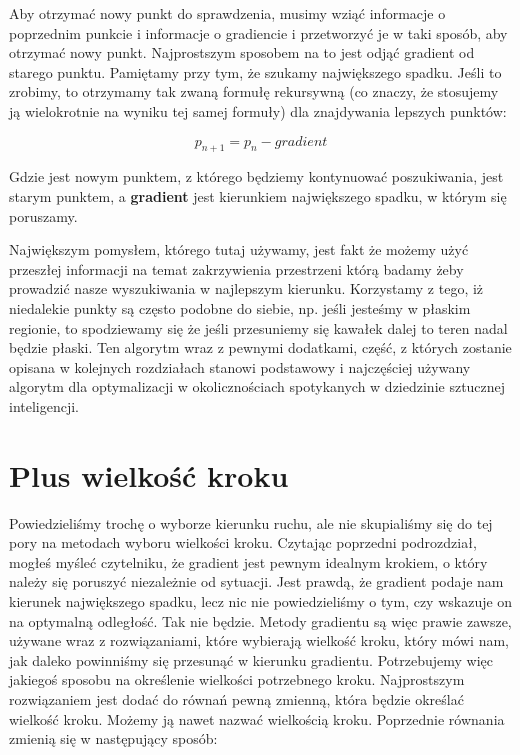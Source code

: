 Aby otrzymać nowy punkt do sprawdzenia, musimy wziąć informacje o poprzednim punkcie i informacje o gradiencie i przetworzyć je w taki sposób, aby otrzymać
nowy punkt. Najprostszym sposobem na to jest odjąć gradient od starego punktu. Pamiętamy przy tym, że szukamy największego spadku. Jeśli to zrobimy, to otrzymamy tak zwaną formułę rekursywną (co znaczy, że stosujemy ją wielokrotnie na wyniku tej samej formuły) dla znajdywania lepszych punktów:

\begin{equation}
p_{n+1} = p_n - gradient
\end{equation}

\noindent Gdzie  jest nowym punktem, z którego będziemy kontynuować poszukiwania,  jest starym punktem, a \textbf{gradient} jest kierunkiem największego spadku, w którym się poruszamy.\newline

Największym pomysłem, którego tutaj używamy, jest fakt że możemy użyć przeszłej informacji na temat zakrzywienia przestrzeni którą badamy żeby prowadzić nasze wyszukiwania w najlepszym kierunku. Korzystamy z tego, iż niedalekie punkty są często podobne do siebie, np. jeśli jesteśmy w płaskim regionie, to spodziewamy się że jeśli przesuniemy się kawałek dalej to teren nadal będzie płaski. Ten algorytm wraz z pewnymi dodatkami, część, z których zostanie opisana w kolejnych rozdziałach stanowi podstawowy i najczęściej używany algorytm dla optymalizacji w okolicznościach spotykanych w dziedzinie sztucznej inteligencji.\newline

\section{Plus wielkość kroku}

Powiedzieliśmy trochę o wyborze kierunku ruchu, ale nie skupialiśmy się do tej pory na metodach wyboru wielkości kroku. Czytając poprzedni podrozdział, mogłeś myśleć czytelniku, że gradient jest pewnym idealnym krokiem, o który należy się poruszyć niezależnie od sytuacji. Jest prawdą, że gradient podaje nam kierunek największego spadku, lecz nic nie powiedzieliśmy o tym, czy wskazuje on na optymalną odległość. Tak nie będzie. Metody gradientu są więc prawie zawsze, używane wraz z rozwiązaniami, które wybierają wielkość kroku, który mówi nam, jak daleko powinniśmy się przesunąć w kierunku gradientu. Potrzebujemy więc jakiegoś sposobu na określenie wielkości potrzebnego kroku. Najprostszym rozwiązaniem jest dodać do równań pewną zmienną, która będzie określać wielkość kroku. Możemy ją nawet nazwać wielkością kroku. Poprzednie równania zmienią się w następujący sposób:\newline

